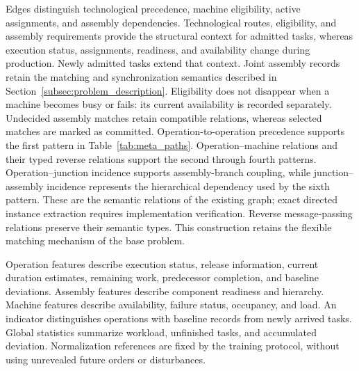 
Edges distinguish technological precedence, machine eligibility, active assignments, and assembly dependencies.
Technological routes, eligibility, and assembly requirements provide the structural context for admitted
tasks, whereas execution status, assignments, readiness, and availability change during production.
Newly admitted tasks extend that context. Joint assembly records retain the matching and synchronization
semantics described in Section~\ref{subsec:problem_description}.
Eligibility does not disappear when a machine becomes busy or fails: its current availability is recorded separately.
Undecided assembly matches retain compatible relations, whereas selected matches are marked as committed.
Operation-to-operation precedence supports the first pattern in Table~\ref{tab:meta_paths}.
Operation--machine relations and their typed reverse relations support the second through fourth
patterns. Operation--junction incidence supports assembly-branch coupling, while junction--assembly
incidence represents the hierarchical dependency used by the sixth pattern. These are the semantic
relations of the existing graph; exact directed instance extraction requires implementation verification.
Reverse message-passing relations preserve their semantic types. This construction retains the flexible
matching mechanism of the base problem.


Operation features describe execution status, release information, current duration estimates,
remaining work, predecessor completion, and baseline deviations. Assembly features describe component readiness
and hierarchy. Machine features describe availability, failure status, occupancy, and load.
An indicator distinguishes operations with baseline records from newly arrived tasks.
Global statistics summarize workload, unfinished tasks, and accumulated deviation.
Normalization references are fixed by the training protocol, without using unrevealed future orders or disturbances.


